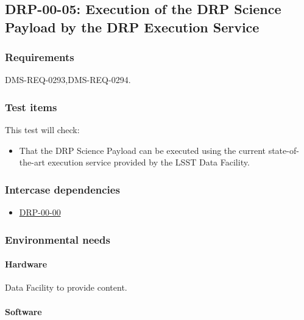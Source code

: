 \subsection{DRP-00-05: Execution of the DRP Science Payload by the DRP Execution Service}
\label{drp-00-05}

\subsubsection{Requirements}

DMS-REQ-0293,DMS-REQ-0294.

\subsubsection{Test items}

This test will check:

\begin{itemize}

  \item{That the DRP Science Payload can be executed using the current
  state-of-the-art execution service provided by the LSST Data Facility.}

\end{itemize}

\subsubsection{Intercase dependencies}

\begin{itemize}

  \item{\hyperref[drp-00-00]{DRP-00-00}}

\end{itemize}

\subsubsection{Environmental needs}

\paragraph{Hardware}

\begin{note}
Data Facility to provide content.
\end{note}

\paragraph{Software}

